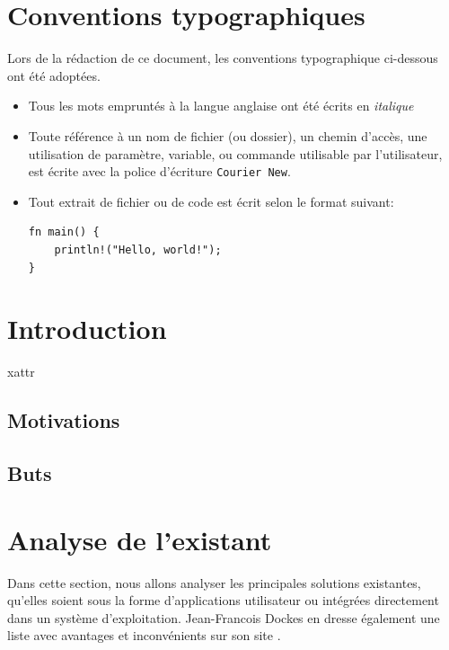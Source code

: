\documentclass[a4paper, 12pt]{article}
\newenvironment{code}{\captionsetup{type=listing}}{}
\begin{document}
\section*{Conventions typographiques}
Lors de la rédaction de ce document, les conventions typographique ci-dessous ont
été adoptées.
\begin{itemize}[label=\textbullet]
	\item Tous les mots empruntés à la langue anglaise ont été écrits en \textit{italique}
	\item Toute référence à un nom de fichier (ou dossier), un chemin d'accès, une 
    utilisation de paramètre, variable, ou commande utilisable par l'utilisateur, 
    est écrite avec la police d'écriture \texttt{Courier New}.
	\item Tout extrait de fichier ou de code est écrit selon le format suivant:
    \bigbreak
    \begin{code}
        \begin{verbatim}
fn main() {
    println!("Hello, world!");
}
        \end{verbatim}
    \end{code}
\end{itemize}
\newpage

\printglossary[type=\acronymtype,title={Acronymes}]
\newpage


\section{Introduction} %
\acrshort{xattr}
\subsection{Motivations}
\subsection{Buts}
\cite{ref3}

\section{Analyse de l'existant} %
Dans cette section, nous allons analyser les principales solutions existantes, qu'elles soient 
sous la forme d'applications utilisateur ou intégrées directement dans un système d'exploitation.
Jean-Francois Dockes en dresse également une liste avec avantages et inconvénients sur son site 
\cite{ref3}.
\end{document}

